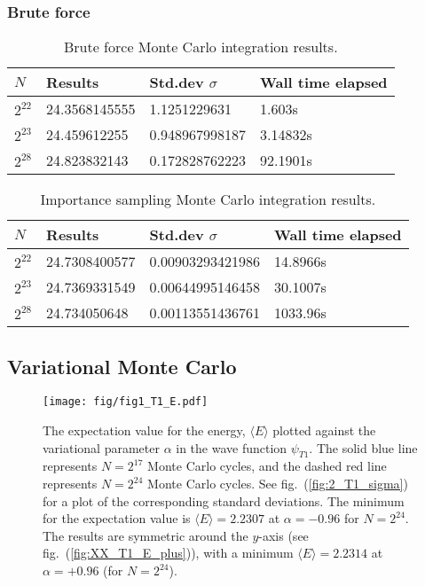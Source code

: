 \documentclass[a4paper,11pt]{article}
\begin{document}
\subsubsection{Brute force}

\begin{table}
    \centering
    \caption{Brute force Monte Carlo integration results.}
    \begin{tabular}{l l l l}
        \hline
        $N$         &   Results     & Std.dev $\sigma$  & Wall time elapsed  \\
        \hline
        $2^{22}$    & 24.3568145555 & 1.1251229631   & 1.603s \\
        $2^{23}$    & 24.459612255  & 0.948967998187 & 3.14832s \\
        $2^{28}$    & 24.823832143  & 0.172828762223 & 92.1901s \\
        \hline
    \end{tabular}
    \label{tab:res_bruteforceMC}
\end{table}
\begin{table}
    \centering
    \caption{Importance sampling Monte Carlo integration results.}
    \begin{tabular}{l l l l}
        \hline
        $N$         &   Results     & Std.dev $\sigma$ & Wall time elapsed  \\
        \hline
        $2^{22}$    & 24.7308400577 & 0.00903293421986 & 14.8966s \\
        $2^{23}$    & 24.7369331549 & 0.00644995146458 & 30.1007s \\
        $2^{28}$    & 24.734050648  & 0.00113551436761 & 1033.96s \\
        \hline
    \end{tabular}
    \label{tab:res_importanceMC}
\end{table}

\subsection{Variational Monte Carlo}
\begin{figure}[htb]
    \centering
    \texttt{[image: fig/fig1\_T1\_E.pdf]}
    \caption{The expectation value for the energy, $\langle E \rangle$ plotted against the variational parameter $\alpha$ in the wave function $\psi_{T1}$. The solid blue line represents $N=2^{17}$ Monte Carlo cycles, and the dashed red line represents $N=2^{24}$ Monte Carlo cycles. See fig.~(\ref{fig:2_T1_sigma}) for a plot of the corresponding standard deviations. The minimum for the expectation value is $\langle E \rangle = 2.2307$ at $\alpha = -0.96$ for $N=2^{24}$. The results are symmetric around the $y$-axis (see fig.~(\ref{fig:XX_T1_E_plus})), with a minimum $\langle E \rangle = 2.2314$ at $\alpha = +0.96$ (for $N=2^{24}$).}
    \label{fig:2_T1_E}
\end{figure}
\end{document}
